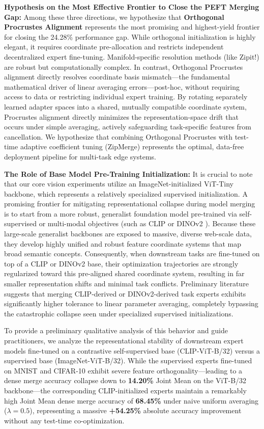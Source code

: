     \textbf{Hypothesis on the Most Effective Frontier to Close the PEFT Merging Gap:} Among these three directions, we hypothesize that \textbf{Orthogonal Procrustes Alignment} represents the most promising and highest-yield frontier for closing the 24.28\% performance gap. While orthogonal initialization is highly elegant, it requires coordinate pre-allocation and restricts independent decentralized expert fine-tuning. Manifold-specific resolution methods (like Zipit!) are robust but computationally complex. In contrast, Orthogonal Procrustes alignment directly resolves coordinate basis mismatch—the fundamental mathematical driver of linear averaging errors—post-hoc, without requiring access to data or restricting individual expert training. By rotating separately learned adapter spaces into a shared, mutually compatible coordinate system, Procrustes alignment directly minimizes the representation-space drift that occurs under simple averaging, actively safeguarding task-specific features from cancellation. We hypothesize that combining Orthogonal Procrustes with test-time adaptive coefficient tuning (ZipMerge) represents the optimal, data-free deployment pipeline for multi-task edge systems.

\textbf{The Role of Base Model Pre-Training Initialization:} It is crucial to note that our core vision experiments utilize an ImageNet-initialized ViT-Tiny backbone, which represents a relatively specialized supervised initialization. A promising frontier for mitigating representational collapse during model merging is to start from a more robust, generalist foundation model pre-trained via self-supervised or multi-modal objectives (such as CLIP \cite{radford2021learning} or DINOv2 \cite{oquab2023dinov2}). Because these large-scale generalist backbones are exposed to massive, diverse web-scale data, they develop highly unified and robust feature coordinate systems that map broad semantic concepts. Consequently, when downstream tasks are fine-tuned on top of a CLIP or DINOv2 base, their optimization trajectories are strongly regularized toward this pre-aligned shared coordinate system, resulting in far smaller representation shifts and minimal task conflicts. Preliminary literature suggests that merging CLIP-derived or DINOv2-derived task experts exhibits significantly higher tolerance to linear parameter averaging, completely bypassing the catastrophic collapse seen under specialized supervised initializations.

To provide a preliminary qualitative analysis of this behavior and guide practitioners, we analyze the representational stability of downstream expert models fine-tuned on a contrastive self-supervised base (CLIP-ViT-B/32) versus a supervised base (ImageNet-ViT-B/32). While the supervised experts fine-tuned on MNIST and CIFAR-10 exhibit severe feature orthogonality—leading to a dense merge accuracy collapse down to \textbf{14.20\%} Joint Mean on the ViT-B/32 backbone—the corresponding CLIP-initialized experts maintain a remarkably high Joint Mean dense merge accuracy of \textbf{68.45\%} under naive uniform averaging ($\lambda=0.5$), representing a massive \textbf{+54.25\%} absolute accuracy improvement without any test-time co-optimization.

